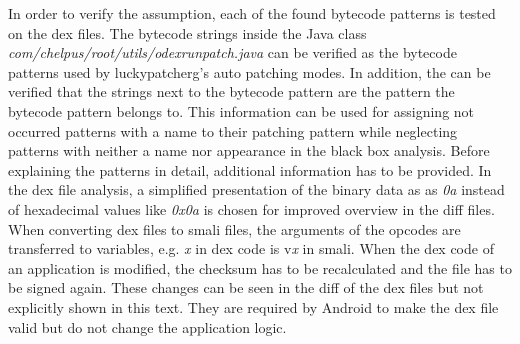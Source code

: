 In order to verify the assumption, each of the found bytecode patterns is tested on the \gls{dex} files.
The bytecode strings inside the Java class \textit{com/chelpus/root/utils/odexrunpatch.java} can be verified as the bytecode patterns used by \gls{luckypatcherg}’s auto patching modes.
In addition, the can be verified that the strings next to the bytecode pattern are the pattern the bytecode pattern belongs to.
This information can be used for assigning not occurred patterns with a name to their patching pattern while neglecting patterns with neither a name nor appearance in the black box analysis.
\newline
\newline
Before explaining the patterns in detail, additional information has to be provided.
In the \gls{dex} file analysis, a simplified presentation of the binary data as as \textit{0a} instead of hexadecimal values like \textit{0x0a} is chosen for improved overview in the diff files.
When converting \gls{dex} files to smali files, the arguments of the opcodes are transferred to variables, e.g. \textit{x} in dex code is v\textit{x} in smali.
\newline
\newline
When the dex code of an application is modified, the checksum has to be recalculated and the file has to be signed again.
These changes can be seen in the diff of the dex files but not explicitly shown in this text.
They are required by Android to make the \gls{dex} file valid but do not change the application logic.

